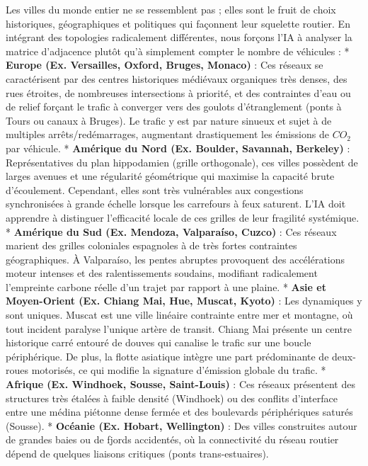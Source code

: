 \documentclass[10pt, a4paper]{article}
\begin{document}
Les villes du monde entier ne se ressemblent pas ; elles sont le fruit
de choix historiques, géographiques et politiques qui façonnent leur
squelette routier. En intégrant des topologies radicalement différentes,
nous forçons l'IA à analyser la matrice d'adjacence plutôt qu'à
simplement compter le nombre de véhicules : * \textbf{Europe (Ex.
Versailles, Oxford, Bruges, Monaco)} : Ces réseaux se caractérisent par
des centres historiques médiévaux organiques très denses, des rues
étroites, de nombreuses intersections à priorité, et des contraintes
d'eau ou de relief forçant le trafic à converger vers des goulots
d'étranglement (ponts à Tours ou canaux à Bruges). Le trafic y est par
nature sinueux et sujet à de multiples arrêts/redémarrages, augmentant
drastiquement les émissions de \(CO_2\) par véhicule. * \textbf{Amérique
du Nord (Ex. Boulder, Savannah, Berkeley)} : Représentatives du plan
hippodamien (grille orthogonale), ces villes possèdent de larges avenues
et une régularité géométrique qui maximise la capacité brute
d'écoulement. Cependant, elles sont très vulnérables aux congestions
synchronisées à grande échelle lorsque les carrefours à feux saturent.
L'IA doit apprendre à distinguer l'efficacité locale de ces grilles de
leur fragilité systémique. * \textbf{Amérique du Sud (Ex. Mendoza,
Valparaíso, Cuzco)} : Ces réseaux marient des grilles coloniales
espagnoles à de très fortes contraintes géographiques. À Valparaíso, les
pentes abruptes provoquent des accélérations moteur intenses et des
ralentissements soudains, modifiant radicalement l'empreinte carbone
réelle d'un trajet par rapport à une plaine. * \textbf{Asie et
Moyen-Orient (Ex. Chiang Mai, Hue, Muscat, Kyoto)} : Les dynamiques y
sont uniques. Muscat est une ville linéaire contrainte entre mer et
montagne, où tout incident paralyse l'unique artère de transit. Chiang
Mai présente un centre historique carré entouré de douves qui canalise
le trafic sur une boucle périphérique. De plus, la flotte asiatique
intègre une part prédominante de deux-roues motorisés, ce qui modifie la
signature d'émission globale du trafic. * \textbf{Afrique (Ex. Windhoek,
Sousse, Saint-Louis)} : Ces réseaux présentent des structures très
étalées à faible densité (Windhoek) ou des conflits d'interface entre
une médina piétonne dense fermée et des boulevards périphériques saturés
(Sousse). * \textbf{Océanie (Ex. Hobart, Wellington)} : Des villes
construites autour de grandes baies ou de fjords accidentés, où la
connectivité du réseau routier dépend de quelques liaisons critiques
(ponts trans-estuaires).
\end{document}
